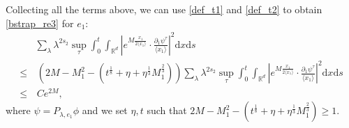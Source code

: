 \documentclass[10pt,twoside,a4paper]{article}
\numberwithin{equation}{section}\allowdisplaybreaks
\def\leq{\leqslant}
\def\geq{\geqslant}
\begin{document}
Collecting  all the terms above, we can use \eqref{def_t1}  and   \eqref{def_t2}  to  obtain   \eqref{bstrap_re3} for   $ e_1 $:
\begin{align} \label{big_est_mom}
	&\sum_{\lambda} \lambda^{ 2s_2}   \sup_{\tau}\int_0^t   \int_{\mathbb{R}^{d}}  \left|	e^{M \frac{x_1}{2\langle x_1\rangle} }\cdot \frac{\partial_1 \psi^\tau }{\langle x_1\rangle}\right|^2   \mathrm{d} x  \mathrm{d} s  \nonumber\\
	\leq 	&\,\left( 2M-M_1^2- \left( t^{\frac 18}+ \eta+  \eta^{\frac 13}  M_1^{\frac 23 }\right)  \right)  \sum_{\lambda} \lambda^{ 2s_2}    \sup_{\tau}\int_0^t   \int_{\mathbb{R}^{d}}  \left|	e^{M \frac{x_1}{2\langle x_1\rangle} }\cdot \frac{\partial_1 \psi^\tau }{\langle x_1\rangle}\right|^2   \mathrm{d} x  \mathrm{d} s \nonumber \\
	\leq  &\,  Ce^{2M},  
\end{align}
where $ \psi=P_{\lambda, e_1}  \phi   $ and we set $ \eta,t $ such that $ 2M-M_1^2- \left( t^{\frac 18}+ \eta+  \eta^{\frac 13}  M_1^{\frac 23 }\right)  \geq 1.  $ 
\end{document}
